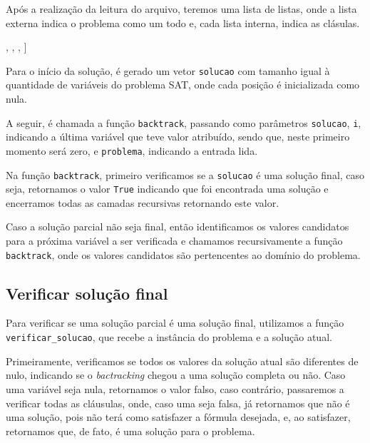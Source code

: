 \documentclass[12pt]{article}
\begin{document}
    \par Após a realização da leitura do arquivo, teremos uma lista de listas, onde a lista externa indica o problema como um todo e, cada lista interna, indica as clásulas.
    
    \begin{tcolorbox}[title=Entrada do programa para a fórmula fornecida, width=\linewidth, 
      fontupper=\ttfamily, 
      halign=flush left]
        [[1, 0, 1, -1], \newline [0, 1, -1, 1], \newline [-1, 1, 0, 0], \newline [0, 0, -1, 1]]
    \end{tcolorbox}

    \par Para o início da solução, é gerado um vetor \verb|solucao| com tamanho igual à quantidade de variáveis do problema SAT, onde cada posição é inicializada como nula.
    
    \par A seguir, é chamada a função \verb|backtrack|, passando como parâmetros \verb|solucao|, \verb|i|, indicando a última variável que teve valor atribuído, sendo que, neste primeiro momento será zero, e \verb|problema|, indicando a entrada lida.
    
    \par Na função \verb|backtrack|, primeiro verificamos se a \verb|solucao| é uma solução final, caso seja, retornamos o valor \verb|True| indicando que foi encontrada uma solução e encerramos todas as camadas recursivas retornando este valor.
    
    \par Caso a solução parcial não seja final, então identificamos os valores candidatos para a próxima variável a ser verificada e chamamos recursivamente a função \verb|backtrack|, onde os valores candidatos são pertencentes ao domínio do problema.

    \subsection{Verificar solução final}
    \par Para verificar se uma solução parcial é uma solução final, utilizamos a função \verb|verificar_solucao|, que recebe a instância do problema e a solução atual. 
    \par Primeiramente, verificamos se todos os valores da solução atual são diferentes de nulo, indicando se o \textit{bactracking} chegou a uma solução completa ou não. Caso uma variável seja nula, retornamos o valor falso, caso contrário, passaremos a verificar todas as cláusulas, onde, caso uma seja falsa, já retornamos que não é uma solução, pois não terá como satisfazer a fórmula desejada, e, ao satisfazer, retornamos que, de fato, é uma solução para o problema.
\end{document}
